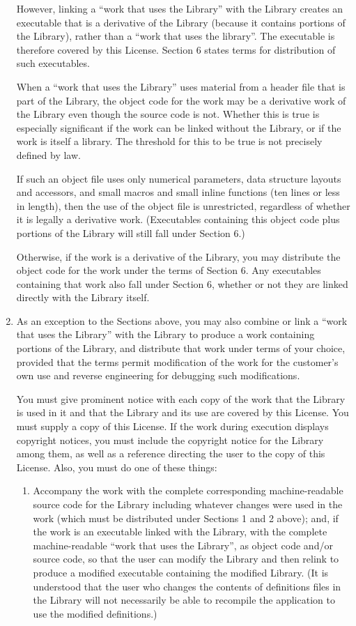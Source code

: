 \begin{enumerate}
  However, linking a ``work that uses the Library'' with the Library
creates an executable that is a derivative of the Library (because it
contains portions of the Library), rather than a ``work that uses the
library''.  The executable is therefore covered by this License.
Section 6 states terms for distribution of such executables.

  When a ``work that uses the Library'' uses material from a header file
that is part of the Library, the object code for the work may be a
derivative work of the Library even though the source code is not.
Whether this is true is especially significant if the work can be
linked without the Library, or if the work is itself a library.  The
threshold for this to be true is not precisely defined by law.

  If such an object file uses only numerical parameters, data
structure layouts and accessors, and small macros and small inline
functions (ten lines or less in length), then the use of the object
file is unrestricted, regardless of whether it is legally a derivative
work.  (Executables containing this object code plus portions of the
Library will still fall under Section 6.)

  Otherwise, if the work is a derivative of the Library, you may
distribute the object code for the work under the terms of Section 6.
Any executables containing that work also fall under Section 6,
whether or not they are linked directly with the Library itself.

\item
As an exception to the Sections above, you may also combine or
link a ``work that uses the Library'' with the Library to produce a
work containing portions of the Library, and distribute that work
under terms of your choice, provided that the terms permit
modification of the work for the customer's own use and reverse
engineering for debugging such modifications.

  You must give prominent notice with each copy of the work that the
Library is used in it and that the Library and its use are covered by
this License.  You must supply a copy of this License.  If the work
during execution displays copyright notices, you must include the
copyright notice for the Library among them, as well as a reference
directing the user to the copy of this License.  Also, you must do one
of these things:

\begin{enumerate}[a]
\item
Accompany the work with the complete corresponding
machine-readable source code for the Library including whatever
changes were used in the work (which must be distributed under
Sections 1 and 2 above); and, if the work is an executable linked
with the Library, with the complete machine-readable ``work that
uses the Library'', as object code and/or source code, so that the
user can modify the Library and then relink to produce a modified
executable containing the modified Library.  (It is understood
that the user who changes the contents of definitions files in the
Library will not necessarily be able to recompile the application
to use the modified definitions.)


\end{enumerate}
\end{enumerate}
